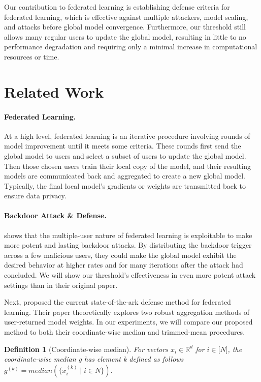 \documentclass{article} %
\newtheorem{definition}{Definition}
\begin{document}
Our contribution to federated learning is establishing defense criteria for federated learning, which is effective against multiple attackers, model scaling, and attacks before global model convergence. Furthermore, our threshold still allows many regular users to update the global model, resulting in little to no performance degradation and requiring only a minimal increase in computational resources or time.

%
\section{Related Work}

\paragraph{Federated Learning.} At a high level, federated learning is an iterative procedure involving rounds of model improvement until it meets some criteria. These rounds first send the global model to users and select a subset of users to update the global model. Then those chosen users train their local copy of the model, and their resulting models are communicated back and aggregated to create a new global model. Typically, the final local model's gradients or weights are transmitted back to ensure data privacy.

\paragraph{Backdoor Attack \& Defense.} \cite{dba} shows that the multiple-user nature of federated learning is exploitable to make more potent and lasting backdoor attacks. By distributing the backdoor trigger across a few malicious users, they could make the global model exhibit the desired behavior at higher rates and for many iterations after the attack had concluded. We will show our threshold's effectiveness in even more potent attack settings than in their original paper.

Next, \cite{trim-mean} proposed the current state-of-the-ark defense method for federated learning. Their paper theoretically explores two robust aggregation methods of user-returned model weights. In our experiments, we will compare our proposed method to both their coordinate-wise median and trimmed-mean procedures.

\begin{definition}[Coordinate-wise median] 
For vectors $x_i \in \mathbb{R}^{d}$ for $i \in \mathopen[N\mathclose]$, the coordinate-wise median g has element k defined as follows $g^{(k)} = median(\{x_i^{(k)} \mid i \in N\})$.
\end{definition}
\end{document}
